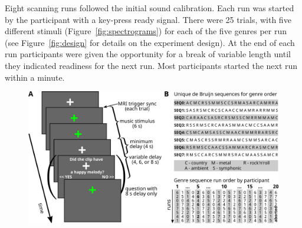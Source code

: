 \documentclass[10pt,a4paper,twocolumn]{article}
\begin{document}
Eight scanning runs followed the initial sound calibration. Each run was
started by the participant with a key-press ready signal. There were 25 trials,
with five different stimuli (Figure~\ref{fig:spectrograms}) for each of the
five genres per run (see Figure~\ref{fig:design} for details on the experiment
design). At the end of each run participants were given the opportunity for a
break of variable length until they indicated readiness for the next run. Most
participants started the next run within a minute.

\begin{figure}[t]
  \centering
  \includegraphics[width=16cm]{design}


\end{figure}
\end{document}
